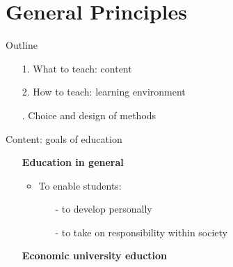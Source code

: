 \section*{General Principles}

\begin{frame}{Outline}
\begin{itemize}[<+->]
	\item[1.] What to teach: content 
	\item[2.] How to teach: learning environment
	\item[\ar 3.] Choice and design of methods
\end{itemize}
\end{frame}
\begin{frame}{Content: goals of education}
	\pause
	\centering
	\vspace{-4mm}
	\begin{itemize}[<+->]
\item[] \hspace{-10mm} \centering \textbf{Education in general}
\vspace{2mm}
\begin{itemize}
	\item To enable students:
	\begin{itemize}
		\item[-]  to develop personally 
		\vspace{1mm}
		\item[-]  to take on responsibility within society %
	\end{itemize}
\end{itemize}
\vspace{2mm}
\item[] \hspace{-10mm} \centering \textbf{Economic university eduction}

\end{itemize}
\end{frame}
